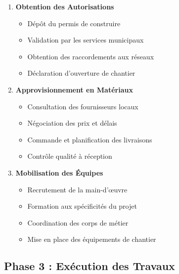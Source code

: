 \begin{enumerate}
    \item \textbf{Obtention des Autorisations}
    \begin{itemize}
        \item Dépôt du permis de construire
        \item Validation par les services municipaux
        \item Obtention des raccordements aux réseaux
        \item Déclaration d'ouverture de chantier
    \end{itemize}
    
    \item \textbf{Approvisionnement en Matériaux}
    \begin{itemize}
        \item Consultation des fournisseurs locaux
        \item Négociation des prix et délais
        \item Commande et planification des livraisons
        \item Contrôle qualité à réception
    \end{itemize}
    
    \item \textbf{Mobilisation des Équipes}
    \begin{itemize}
        \item Recrutement de la main-d'œuvre
        \item Formation aux spécificités du projet
        \item Coordination des corps de métier
        \item Mise en place des équipements de chantier
    \end{itemize}
\end{enumerate}

\subsection{Phase 3 : Exécution des Travaux}

